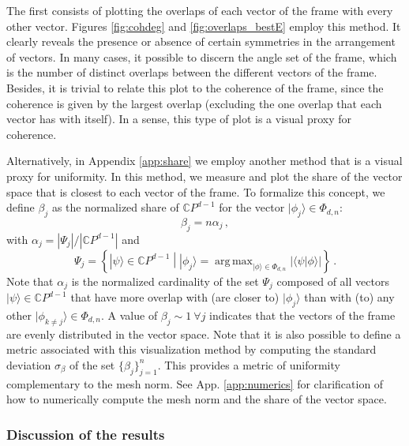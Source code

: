 \documentclass[%
superscriptaddress,
amsmath,amssymb,
 aps,
pra,
floatfix,
]{revtex4-2}
\DeclareMathOperator*{\argmax}{arg\,max}
\newcommand{\relmiddle}[1]{\mathrel{}\middle#1\mathrel{}}
\begin{document}
The first consists of plotting the overlaps of each vector of the frame with every other vector. Figures \ref{fig:cohdeg} and \ref{fig:overlaps_bestE} employ this method. It clearly reveals the presence or absence of certain symmetries in the arrangement of vectors. In many cases, it possible to discern the angle set of the frame, which is the number of distinct overlaps between the different vectors of the frame. Besides, it is trivial to relate this plot to the coherence of the frame, since the coherence is given by the largest overlap (excluding the one overlap that each vector has with itself). 
In a sense, this type of plot is a visual proxy for coherence.

Alternatively, in Appendix \ref{app:share} we employ another method that is a visual proxy for uniformity. In this method, we measure and plot the share of the vector space that is closest to each vector of the frame. To formalize this concept, we define $\beta_j$ as the normalized share of $\mathbb CP^{d-1}$ for the vector $|\phi_j\rangle \in \Phi_{d,n}$:
%
\begin{equation}
    \label{eq:share_hilbert}
    \beta_j = n \alpha_j \,,
\end{equation}
%
with $\alpha_j = |\Psi_j|/|\mathbb CP^{d-1}|$ and
%
\begin{equation}
    \Psi_j = \left\{ |\psi\rangle\in\mathbb CP^{d-1} \relmiddle| |\phi_j\rangle = \argmax_{|\phi\rangle\in\Phi_{d,n}} |\langle\psi|\phi\rangle| \right\} \,.
\end{equation}
%
Note that $\alpha_j$ is the normalized cardinality of the set $\Psi_j$ composed of all vectors $|\psi\rangle \in \mathbb CP^{d-1}$ that have more overlap with (are closer to) $|\phi_j\rangle$ than with (to) any other $|\phi_{k\neq j}\rangle\in\Phi_{d,n}$.
A value of $\beta_j \sim 1 \ \forall j$ indicates that the vectors of the frame are evenly distributed in the vector space.
Note that it is also possible to define a metric associated with this visualization method by computing the standard deviation $\sigma_\beta$ of the set $\{\beta_j\}_{j=1}^n$. This provides a metric of uniformity complementary to the mesh norm. See App. \ref{app:numerics} for clarification of how to numerically compute the mesh norm and the share of the vector space.

\subsubsection{Discussion of the results}
\end{document}
